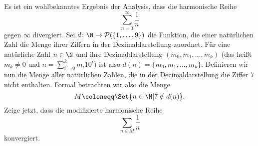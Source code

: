 \begin{exercise}
  Es ist ein wohlbekanntes Ergebnis der Analysis, dass die harmonische Reihe
  \[
    \sum_{n = 0}^\infty \frac{1}{n}
  \]
  gegen $\infty$ divergiert. Sei $d \colon \N \to \mathcal{P}(\{1, \dots, 9\})$
  die Funktion, die einer natürlichen Zahl die Menge ihrer Ziffern in der
  Dezimaldarstellung zuordnet. Für eine natürliche Zahl $n \in \N$ und ihre
  Dezimaldarstellung $(m_0, m_1, \dots, m_k)$ (das heißt $m_k \neq 0$ und
  $n = \sum_{i = 0}^k m_i 10^i$) ist also $d(n) = \{m_0, m_1, \dots, m_k\}$.
  Definieren wir nun die Menge aller natürlichen Zahlen, die in der
  Dezimaldarstellung die Ziffer $7$ nicht enthalten. Formal betrachten wir also
  die Menge
  \[
    M \coloneqq \Set{n \in \N | 7 \notin d(n)}.
  \]
  Zeige jetzt, dass die modifizierte harmonische Reihe
  \[
    \sum_{n \in M} \frac{1}{n}
  \]
  konvergiert.
\end{exercise}
